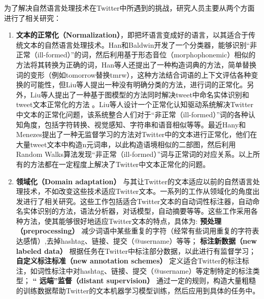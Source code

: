 为了解决自然语言处理技术在Twitter中所遇到的挑战，研究人员主要从两个方面进行了相关研究：
\begin{enumerate}
\item \textbf{文本的正常化（Normalization）}，即把坏语言变成好的语言，以其适合于传统文本的自然语言处理技术。Han和Baldwin开发了一个分类器，能够识别“非正常（ill-formed）”的词，然后利用基于形态音位（morphophonemic）相似的方法将其转换为正确的词，Han等人还提出了一种构造词典的方法，简单替换词的变形（例如tomorrow替换tmrw），这种方法结合词语的上下文评估各种变换的可能性，但Liu等人提出一种没有明确分类的方法，进行词的正常化。另外，Liu等人提出了一种基于图模型的方法同时解决tweet中命名实体识别和tweet文本正常化的方法 。Liu等人设计一个正常化认知驱动系统解决Twitter中文本的正常化问题，该系统整合人们对于“非正常（ill-formed）”词的各种认知角度，包括字符转换、视觉感知、字符串和语音相似等等。最近Hany和Menezes提出了一种无监督学习的方法对Twitter中的文本进行正常化，他们在大量tweet文本中构造n元词串，以此构造语境相似的二部图，然后利用Random Walks算法发现“非正常（ill-formed）”词与正常词的对应关系。以上所有的方法都在一定程度上解决了Twitter中文本正常化的问题。

\item \textbf{领域化（Domain adaptation）} 与其让Twitter的文本适应以前的自然语言处理技术，不如改变这些技术适应Twitter文本。一系列的工作从领域化的角度出发进行了相关研究。这些工作包括适合Twitter文本的自动词性标注器，自动命名实体识别的方法，语法分析器，对话模型，自动摘要等等。这些工作采用各种方法，使其能够很好地适应Twitter文本的特点，具体为:
\subitem \textbf{预处理（preprocessing）} 减少词语中某些重复的字符（经常有些词用重复的字符表达感情）,去掉hashtag、链接、提交（@username）等等；
\subitem  \textbf{标注新数据（new labeled data）} 根据任务在Twitter中标注部分数据，以此进行有监督学习；
\subitem \textbf{自定义标注标准（new annotation schemes）} 定义适合Twitter的标注标注，如词性标注中对hashtag、链接、提交（@username）等定制特定的标注类型；
\subitem \textbf{“	远端”监督（distant supervision）} 通过一定的规则，构造大量粗糙的训练数据帮助Twitter的文本机器学习模型训练，然后应用到具体的任务中。
\end{enumerate}

